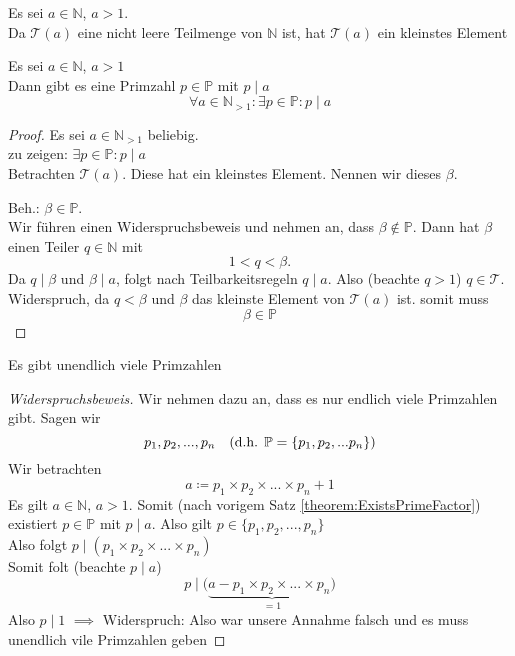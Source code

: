 \documentclass[a4paper, parskip = true, fleqn, headsepline = true]{scrartcl}
\newcommand{\qed}{\tag{$\square$}}
\DeclareRobustCommand{\qed}{%
	\ifmmode \tag*{$\square$}%
	\else \leavevmode\unskip\penalty9999 \hbox{}\nobreak\hfill\quad\hbox{$\square$}%
	\fi%
}
\newcommand{\N}{\mathbb{N}}
\begin{document}
\begin{corollary}
	Es sei $ a \in \N $, $ a > 1 $.\\
	Da $ \mathcal{T}(a) $ eine nicht leere Teilmenge von $ \N $ ist, hat $ \mathcal{T}(a) $ ein kleinstes Element
\end{corollary}

\begin{theorem}
	\label{theorem:ExistsPrimeFactor}
	Es sei $ a \in \N $, $ a > 1 $\\
	Dann gibt es eine Primzahl $ p \in \mathbb{P} $ mit $ p \mid a $
	\[ \forall a \in \N_{>1} : \exists p \in \mathbb{P} : p \mid a \]
	\begin{proof}
		Es sei $ a \in \N_{>1} $ beliebig.\\
		zu zeigen: $ \exists p \in \mathbb{P} : p \mid a $\\
		Betrachten $ \mathcal{T}(a) $. Diese hat ein kleinstes Element. Nennen wir dieses $ \beta $.\par
		Beh.: $ \beta \in \mathbb{P} $.\\
		Wir führen einen Widerspruchsbeweis und nehmen an, dass $ \beta \notin \mathbb{P} $. Dann hat $ \beta $ einen Teiler $ q \in \N $ mit
		\[ 1 < q < \beta. \]
		Da $ q \mid \beta $  und $ \beta \mid a $, folgt nach Teilbarkeitsregeln $ q \mid a $. Also (beachte $ q > 1 $) $ q \in \mathcal{T} $.\\
		Widerspruch, da $ q < \beta $ und $ \beta $ das kleinste Element von $ \mathcal{T}(a) $ ist.
		somit muss
		\[ \beta \in \mathbb{P} \qed \]
	\end{proof}
\end{theorem}

\begin{theorem}[(Euklid)]
	Es gibt unendlich viele Primzahlen
	\begin{proof}[Widerspruchsbeweis]
		Wir nehmen dazu an, dass es nur endlich viele Primzahlen gibt. Sagen wir
		\[ p_1, p_2, ..., p_n \quad \text{(d.h. $ \mathbb{P} = \{ p_1, p_2, ... p_n \} $)} \]
		Wir betrachten
		\[ a \coloneqq p_1 \times p_2 \times ... \times p_n + 1 \]
		Es gilt $ a \in \N $, $ a > 1 $. Somit (nach vorigem Satz \ref{theorem:ExistsPrimeFactor}) existiert $ p \in \mathbb{P} $ mit $ p \mid a $. Also gilt $ p \in \{ p_1, p_2, ..., p_n \} $\\
		Also folgt $ p \mid ( p_1 \times p_2 \times ... \times p_n ) $\\
		Somit folt (beachte $ p \mid a $)
		\[ p \mid ( \underbrace{ a - p_1 \times p_2 \times ... \times p_n ) }_{=1} \]
		Also $ p \mid 1 $ $ \implies $ Widerspruch: Also war unsere Annahme falsch und es muss unendlich vile Primzahlen geben \qed
	\end{proof}
\end{theorem}
\end{document}
